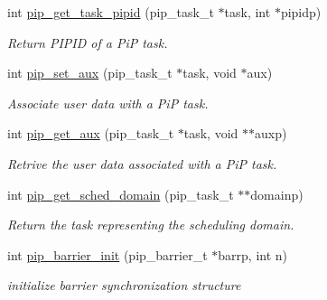 \begin{DoxyCompactItemize}
\item 
int \hyperlink{group__libpip_ga14a1b03ec6564885a5dd97dbc27167aa}{pip\-\_\-get\-\_\-task\-\_\-pipid} (pip\-\_\-task\-\_\-t $\ast$task, int $\ast$pipidp)
\begin{DoxyCompactList}\small\item\em Return P\-I\-P\-I\-D of a Pi\-P task. \end{DoxyCompactList}\end{DoxyCompactItemize}
\begin{DoxyCompactItemize}
\item 
int \hyperlink{group__libpip_gacfd984207deedf86edddbb72c5d4e883}{pip\-\_\-set\-\_\-aux} (pip\-\_\-task\-\_\-t $\ast$task, void $\ast$aux)
\begin{DoxyCompactList}\small\item\em Associate user data with a Pi\-P task. \end{DoxyCompactList}\end{DoxyCompactItemize}
\begin{DoxyCompactItemize}
\item 
int \hyperlink{group__libpip_ga8bf51911ca0b18340b29fae90ab59b03}{pip\-\_\-get\-\_\-aux} (pip\-\_\-task\-\_\-t $\ast$task, void $\ast$$\ast$auxp)
\begin{DoxyCompactList}\small\item\em Retrive the user data associated with a Pi\-P task. \end{DoxyCompactList}\end{DoxyCompactItemize}
\begin{DoxyCompactItemize}
\item 
int \hyperlink{group__libpip_ga32119e3a41a4073b52ade76bf87a5589}{pip\-\_\-get\-\_\-sched\-\_\-domain} (pip\-\_\-task\-\_\-t $\ast$$\ast$domainp)
\begin{DoxyCompactList}\small\item\em Return the task representing the scheduling domain. \end{DoxyCompactList}\end{DoxyCompactItemize}
\begin{DoxyCompactItemize}
\item 
int \hyperlink{group__libpip_ga84022f9c64f431e7d513342aeed0b61e}{pip\-\_\-barrier\-\_\-init} (pip\-\_\-barrier\-\_\-t $\ast$barrp, int n)
\begin{DoxyCompactList}\small\item\em initialize barrier synchronization structure \end{DoxyCompactList}\end{DoxyCompactItemize}
